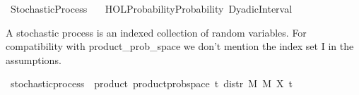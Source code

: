 %
\begin{isabellebody}%
%
%
\isadelimtheory
%
\endisadelimtheory
%
\isatagtheory
{}\isamarkupfalse%
\ Stochastic{\isacharunderscore}{\kern0pt}Process\isanewline
\ \ \ {\isachardoublequoteopen}HOL{\isacharminus}{\kern0pt}Probability{\isachardot}{\kern0pt}Probability{\isachardoublequoteclose}\ {\isachardoublequoteopen}Dyadic{\isacharunderscore}{\kern0pt}Interval{\isachardoublequoteclose}\isanewline
{}%
\endisatagtheory
{\isafoldtheory}%
%
\isadelimtheory
%
\endisadelimtheory
%
\begin{isamarkuptext}%
A stochastic process is an indexed collection of random variables. For compatibility with 
  product_prob_space we don't mention the index set I in the assumptions.%
\end{isamarkuptext}\isamarkuptrue%
%
\isamarkupfalse%
\ stochastic{\isacharunderscore}{\kern0pt}process\ {\isasymsubseteq}\ product{\isacharcolon}{\kern0pt}\ product{\isacharunderscore}{\kern0pt}prob{\isacharunderscore}{\kern0pt}space\ {\isachardoublequoteopen}{\isacharparenleft}{\kern0pt}{\isasymlambda}t{\isachardot}{\kern0pt}\ distr\ M\ M{\isacharprime}{\kern0pt}\ {\isacharparenleft}{\kern0pt}X\ t{\isacharparenright}{\kern0pt}{\isacharparenright}{\kern0pt}{\isachardoublequoteclose}\isanewline

\end{isabellebody}
